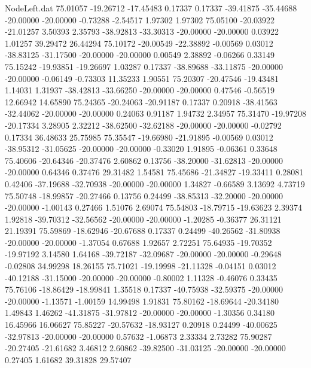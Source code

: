 \begin{filecontents}{NodeLeft.dat}
  75.01057  -19.26712  -17.45483     0.17337    0.17337  -39.41875  -35.44688  -20.00000  -20.00000   -0.73288   -2.54517    1.97302    1.97302
  75.05100  -20.03922  -21.01257     3.50393    2.35793  -38.92813  -33.30313  -20.00000  -20.00000    0.03922    1.01257   39.29472   26.44294
  75.10172  -20.00549  -22.38892    -0.00569    0.03012  -38.83125  -31.17500  -20.00000  -20.00000    0.00549    2.38892   -0.06266    0.33149
  75.15242  -19.93851  -19.26697     1.03287    0.17337  -38.89688  -33.11875  -20.00000  -20.00000   -0.06149   -0.73303   11.35233    1.90551
  75.20307  -20.47546  -19.43481     1.14031    1.31937  -38.42813  -33.66250  -20.00000  -20.00000    0.47546   -0.56519   12.66942   14.65890
  75.24365  -20.24063  -20.91187     0.17337    0.20918  -38.41563  -32.44062  -20.00000  -20.00000    0.24063    0.91187    1.94732    2.34957
  75.31470  -19.97208  -20.17334     3.28905    2.32212  -38.62500  -32.62188  -20.00000  -20.00000   -0.02792    0.17334   36.48633   25.75985
  75.35547  -19.66980  -21.91895    -0.00569    0.03012  -38.95312  -31.05625  -20.00000  -20.00000   -0.33020    1.91895   -0.06361    0.33648
  75.40606  -20.64346  -20.37476     2.60862    0.13756  -38.20000  -31.62813  -20.00000  -20.00000    0.64346    0.37476   29.31482    1.54581
  75.45686  -21.34827  -19.33411     0.28081    0.42406  -37.19688  -32.70938  -20.00000  -20.00000    1.34827   -0.66589    3.13692    4.73719
  75.50748  -18.99857  -20.27466     0.13756    0.24499  -38.85313  -32.20000  -20.00000  -20.00000   -1.00143    0.27466    1.51076    2.69074
  75.54803  -18.79715  -19.63623     2.39374    1.92818  -39.70312  -32.56562  -20.00000  -20.00000   -1.20285   -0.36377   26.31121   21.19391
  75.59869  -18.62946  -20.67688     0.17337    0.24499  -40.26562  -31.80938  -20.00000  -20.00000   -1.37054    0.67688    1.92657    2.72251
  75.64935  -19.70352  -19.97192     3.14580    1.64168  -39.72187  -32.09687  -20.00000  -20.00000   -0.29648   -0.02808   34.99298   18.26155
  75.71021  -19.19998  -21.11328    -0.04151    0.03012  -40.12188  -31.15000  -20.00000  -20.00000   -0.80002    1.11328   -0.46076    0.33435
  75.76106  -18.86429  -18.99841     1.35518    0.17337  -40.75938  -32.59375  -20.00000  -20.00000   -1.13571   -1.00159   14.99498    1.91831
  75.80162  -18.69644  -20.34180     1.49843    1.46262  -41.31875  -31.97812  -20.00000  -20.00000   -1.30356    0.34180   16.45966   16.06627
  75.85227  -20.57632  -18.93127     0.20918    0.24499  -40.00625  -32.97813  -20.00000  -20.00000    0.57632   -1.06873    2.33334    2.73282
  75.90287  -20.27405  -21.61682     3.46812    2.60862  -39.82500  -31.03125  -20.00000  -20.00000    0.27405    1.61682   39.31828   29.57407

\end{filecontents}
